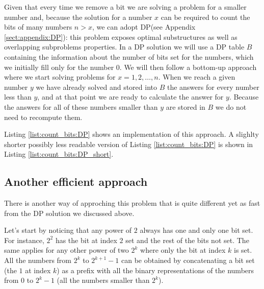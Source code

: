 Given that every time we remove a bit we are solving a problem for a smaller number and, because the
solution for a number $x$ can be required to count the bits of many numbers $n>x$, we can adopt
DP(see Appendix \ref{sect:appendix:DP}): this problem exposes optimal substructures as well as overlapping subproblems properties.
In a DP solution we will use a DP table $B$ containing the information about the number of bits set for the numbers, which we initially fill only for the number $0$. We will
then follow a bottom-up approach where we start solving problems for $x=1,2,\ldots,n$. When we
reach a given number $y$ we have already solved and stored into $B$ the answers for every number less
than $y$, and at that point we are ready to calculate the answer for $y$.
Because the answers for all of
these numbers smaller than $y$ are stored in $B$ we do not need to recompute them. 

Listing \ref{list:count_bits:DP} shows an implementation of this approach. 
A slighlty shorter possibly less readable version of Listing \ref{list:count_bits:DP} is shown in Listing \ref{list:count_bits:DP_short}.





\subsection{Another efficient approach}
\label{count_bits:sec:pattern}
There is another way of approching this problem that is quite different yet as fast from the DP solution we discussed above. 

Let's start by noticing that any power of $2$ always has one and only one bit set.
For instance, $2^2$ has the bit at index $2$ set and the rest of the bits not set. The same applies
for any other power of two $2^k$ where only the bit at index $k$ is set. 
All the numbers from $2^k$
to $2^{k+1}-1$ can be obtained by concatenating a bit set (the $1$ at index $k$) as a prefix with all the binary representations of the numbers from $0$ to $2^k-1$ (all the numbers smaller than $2^k$).

